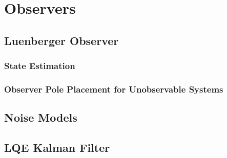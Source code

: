 \section{Observers}

\subsection{Luenberger Observer}

\subsubsection{State Estimation}

\subsubsection{Observer Pole Placement for Unobservable Systems}

\subsection{Noise Models}

\subsection{LQE Kalman Filter}

